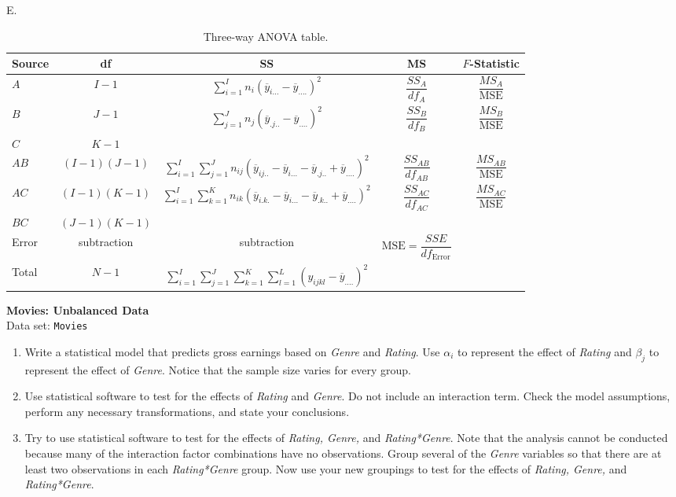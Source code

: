 \documentclass[
]{report}
\newcounter{excount}
\renewcommand{\theexcount}{E\arabic{excount}}
\begin{document}
\begin{list}{\theexcount.}{ \setlength{\itemsep}{1.2em}}
\begin{table}[!h]
\centering
\caption{\label{tab:tab9}Three-way ANOVA table.}
\centering
\begin{tabular}[t]{lcccc}
\toprule
Source & df & SS & MS & $F$-Statistic\\
\midrule
$A$ & $I - 1$ & $\displaystyle\sum_{i=1}^{I} n_i (\overline{y}_{i...} - \overline{y}_{....})^2$ & $\dfrac{SS_A}{df_A}$ & $\dfrac{MS_A}{\text{MSE}}$\\
$B$ & $J - 1$ & $\displaystyle\sum_{j=1}^{J} n_j (\overline{y}_{.j..} - \overline{y}_{....})^2$ & $\dfrac{SS_B}{df_B}$ & $\dfrac{MS_B}{\text{MSE}}$\\
$C$ & $K - 1$ &  &  & \\
$AB$ & $(I-1)(J-1)$ & $\displaystyle\sum_{i=1}^I\sum_{j=1}^J n_{ij}(\overline{y}_{ij..} - \overline{y}_{i...} - \overline{y}_{.j..} + \overline{y}_{....})^2$ & $\dfrac{SS_{AB}}{df_{AB}}$ & $\dfrac{MS_{AB}}{\text{MSE}}$\\
$AC$ & $(I-1)(K-1)$ & $\displaystyle\sum_{i=1}^I\sum_{k=1}^K n_{ik}(\overline{y}_{i.k.} - \overline{y}_{i...} - \overline{y}_{.k..} + \overline{y}_{....})^2$ & $\dfrac{SS_{AC}}{df_{AC}}$ & $\dfrac{MS_{AC}}{\text{MSE}}$\\
\addlinespace
$BC$ & $(J-1)(K-1)$ &  &  & \\
Error & subtraction & subtraction & $\text{MSE} = \dfrac{SSE}{df_{\text{Error}}}$ & \\
Total & $N-1$ & $\displaystyle\sum_{i=1}^I\sum_{j=1}^J\sum_{k=1}^K\sum_{l=1}^L (y_{ijkl} - \overline{y}_{....})^2$ &  & \\
\bottomrule
\end{tabular}
\end{table}

  \item \textbf{Movies: Unbalanced Data}\\
  Data set: \texttt{Movies}
  \begin{enumerate}
    \item Write a statistical model that predicts gross earnings based on \textit{Genre} and \textit{Rating}. Use $\alpha_i$ to represent the effect of \textit{Rating} and $\beta_j$ to represent the effect of \textit{Genre}. Notice that the sample size varies for every group.
    \item Use statistical software to test for the effects of \textit{Rating} and \textit{Genre}. Do not include an interaction term. Check the model assumptions, perform any necessary transformations, and state your conclusions.
    \item Try to use statistical software to test for the effects of \textit{Rating, Genre,} and \textit{Rating*Genre}. Note that the analysis cannot be conducted because many of the interaction factor combinations have no observations. Group several of the \textit{Genre} variables so that there are at least two observations in each \textit{Rating*Genre} group. Now use your new groupings to test for the effects of \textit{Rating, Genre,} and \textit{Rating*Genre}.
  \end{enumerate}


\end{list}
\end{document}
